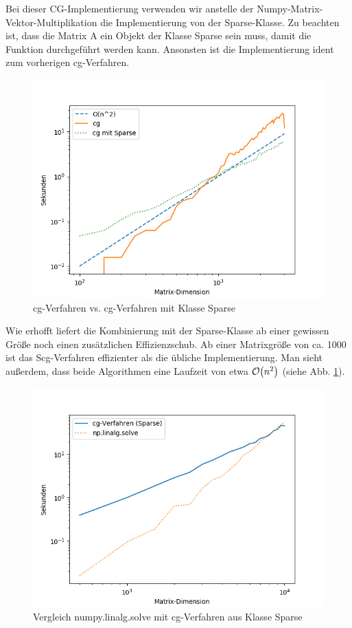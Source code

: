 Bei dieser CG-Implementierung verwenden wir anstelle der Numpy-Matrix-Vektor-Multiplikation die Implementierung von der Sparse-Klasse.
Zu beachten ist, dass die Matrix A ein Objekt der Klasse Sparse sein muss, damit die Funktion durchgeführt werden kann.
Ansonsten ist die Implementierung ident zum vorherigen cg-Verfahren.
\newpage
\begin{figure}
    \centering
    \includegraphics[width=0.9\linewidth]{Aufgabe_1/Cg_Scg.png}
    \caption{cg-Verfahren vs. cg-Verfahren mit Klasse Sparse}
    \label{scg}
\end{figure}
\FloatBarrier
Wie erhofft liefert die Kombinierung mit der Sparse-Klasse ab einer gewissen Größe noch einen zusätzlichen Effizienzschub.
Ab einer Matrixgröße von ca. 1000 ist das Scg-Verfahren effizienter als die übliche Implementierung.
Man sieht außerdem, dass beide Algorithmen eine Laufzeit von etwa $\mathcal{O} {\left ( n^2 \right )}$ (siehe Abb. \ref{scg}).

\begin{figure}
    \centering
    \includegraphics[width=0.8\linewidth]{Aufgabe_1/Scg_npsolve.png}
    \caption{Vergleich numpy.linalg.solve mit cg-Verfahren aus Klasse Sparse}
    \label{linalgvs}
\end{figure}
\FloatBarrier

